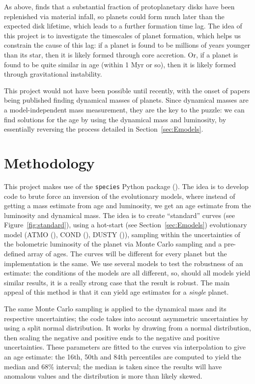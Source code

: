 \documentclass[11pt]{report}
\begin{document}
\begin{mainf}
As above, \citet{Kuffmeier2026} finds that a substantial fraction of protoplanetary disks have been replenished via material infall, so planets could form much later than the expected disk lifetime, which leads to a further formation time lag. The idea of this project is to investigate the timescales of planet formation, which helps us
constrain the cause of this lag: if a planet is found to be millions of years younger than its star, then it is likely formed through core accretion. Or, if a planet is found to be quite similar in age (within 1 Myr or so), then it is likely formed through gravitational instability.

This project would not have been possible until recently, with the onset of papers being published finding dynamical masses of planets. Since dynamical masses are a model-independent mass measurement, they are the key to the puzzle: we can find solutions for the age by using the dynamical mass and luminosity, by essentially reversing the process
detailed in Section~\ref{sec:Emodels}.


\chapter{Methodology}\label{chap:method}
This project makes use of the \texttt{species} Python package (\citealp{Stolker2020}). The idea is to develop code to brute force an inversion of the evolutionary models, where instead
of getting a mass estimate from age and luminosity, we get an age estimate from the luminosity and dynamical mass. The idea is to create ``standard'' curves (see Figure~\ref{fig:standard}), using a hot-start (see Section~\ref{sec:Emodels}) evolutionary model (ATMO (\citealp{Phillips2020}), COND (\citealp{Baraffe2003}), DUSTY (\citealp{Chabrier2000})), 
sampling within the uncertainties of the bolometric luminosity of the planet via Monte Carlo sampling and a pre-defined array of ages. The curves will be different for every planet but the implementation is the same. We use several models to test the robustness of an estimate: the conditions of the models are all different, 
so, should all models yield similar results, it is a really strong case that the result is robust. The main appeal of this method is that it can yield age estimates for a \textit{single} planet.

The same Monte Carlo sampling is applied to the dynamical mass and its respective uncertainties; the code takes into account asymmetric uncertainties by using a split normal distribution. It works by drawing from a normal distribution, then scaling the negative and positive ends to the negative and positive uncertainties.
These parameters are fitted to the curves via interpolation to give an age estimate: the 16th, 50th and 84th percentiles are computed to yield
the median and 68\% interval; the median is taken since the results will have anomalous values and the distribution is more than likely skewed. 


\end{mainf}
\end{document}
